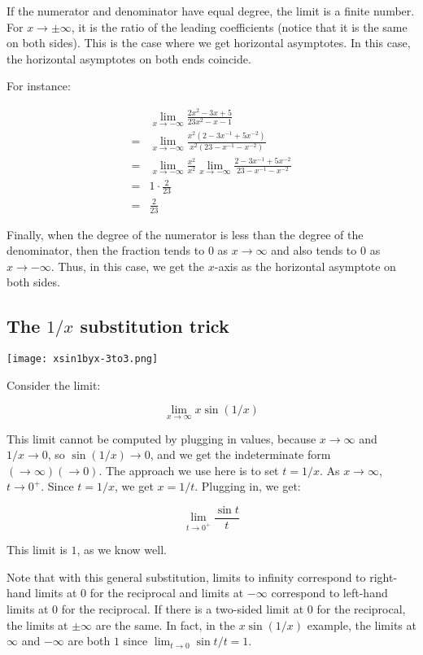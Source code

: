 \documentclass[10pt]{amsart}
\begin{document}
If the numerator and denominator have equal degree, the limit is a
finite number. For $x \to \pm \infty$, it is the ratio of the leading
coefficients (notice that it is the same on both sides). This is the
case where we get horizontal asymptotes. In this case, the horizontal
asymptotes on both ends coincide.

For instance:

\begin{align*}
  & \lim_{x \to -\infty} \frac{2x^2 - 3x + 5}{23x^2 - x - 1}\\
  = & \lim_{x \to -\infty} \frac{x^2(2 - 3x^{-1} + 5x^{-2})}{x^2(23 - x^{-1} - x^{-2})}\\
  = & \lim_{x \to -\infty} \frac{x^2}{x^2} \lim_{x \to -\infty} \frac{2 - 3x^{-1} + 5x^{-2}}{23 - x^{-1} - x^{-2}}\\
  = & 1 \cdot \frac{2}{23}\\
  = & \frac{2}{23}
\end{align*}

Finally, when the degree of the numerator is less than the degree of
the denominator, then the fraction tends to $0$ as $x \to \infty$ and
also tends to $0$ as $x \to -\infty$. Thus, in this case, we get the
$x$-axis as the horizontal asymptote on both sides.
\subsection{The $1/x$ substitution trick}

\texttt{[image: xsin1byx-3to3.png]}

Consider the limit:

$$\lim_{x \to \infty} x \sin(1/x)$$

This limit cannot be computed by plugging in values, because $x \to
\infty$ and $1/x \to 0$, so $\sin(1/x) \to 0$, and we get the
indeterminate form $(\to \infty)(\to 0)$. The approach we use here is
to set $t = 1/x$. As $x \to \infty$, $t \to 0^+$. Since $t = 1/x$, we
get $x = 1/t$. Plugging in, we get:

$$\lim_{t \to 0^+} \frac{\sin t}{t}$$

This limit is $1$, as we know well.

Note that with this general substitution, limits to infinity
correspond to right-hand limits at $0$ for the reciprocal and limits
at $-\infty$ correspond to left-hand limits at $0$ for the
reciprocal. If there is a two-sided limit at $0$ for the reciprocal,
the limits at $\pm \infty$ are the same. In fact, in the $x\sin(1/x)$
example, the limits at $\infty$ and $-\infty$ are both $1$ since
$\lim_{t \to 0} \sin t/t = 1$.
\end{document}
